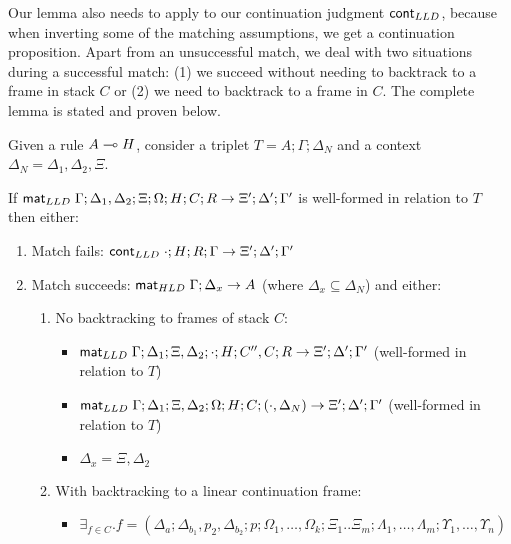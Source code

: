 Our lemma also needs to apply to our continuation judgment $\mathsf{cont}_{LLD}$, because when inverting some of
the matching assumptions, we get a continuation proposition. Apart from an unsuccessful match, we deal
with two situations during a successful match: (1) we succeed without needing to backtrack to a frame
in stack $C$ or (2) we need to backtrack to a frame in $C$. The complete lemma is stated and proven below.

{\footnotesize
\begin{lemma}\label{thm:body_match}
   
Given a rule $A \multimap H$, consider a triplet $T = A; \Gamma; \Delta_{N}$ and a context $\Delta_{N} = \Delta_1, \Delta_2, \Xi$.

If $\mathsf{mat}_{LLD} \; \Gamma; \Delta_1, \Delta_2; \Xi; \Omega; H; C; R \rightarrow \Xi';
\Delta'; \Gamma'$ is well-formed in relation to $T$ then either:

\begin{enumerate}
   \item Match fails: $\mathsf{cont}_{LLD} \; \cdot; H; R; \Gamma \rightarrow \Xi'; \Delta'; \Gamma'$
   \item Match succeeds: $\mathsf{mat}_{HLD} \; \Gamma; \Delta_x \rightarrow A$ (where $\Delta_x
         \subseteq \Delta_N$) and either:
      \begin{enumerate}
         \item No backtracking to frames of stack $C$:
         
         \begin{itemize}
            \item $\mathsf{mat}_{LLD} \; \Gamma; \Delta_1; \Xi, \Delta_2; \cdot; H; C'', C; R
               \rightarrow \Xi'; \Delta'; \Gamma'$ (well-formed in relation to $T$)
            \item $\mathsf{mat}_{LLD} \; \Gamma; \Delta_1; \Xi, \Delta_2; \Omega; H; C; (\cdot, \Delta_N) \rightarrow \Xi'; \Delta'; \Gamma'$ (well-formed in relation to $T$)
            \item $\Delta_x = \Xi, \Delta_2$
         \end{itemize}

         \item With backtracking to a linear continuation frame:
         
         \begin{itemize}

            \item $\exists_{f \in C}. f = (\Delta_a; \Delta_{b_1}, p_2, \Delta_{b_2}; p;
                  \Omega_1, \dotsc, \Omega_k; \Xi_1 .. \Xi_m; \Lambda_1, \dotsc,
                  \Lambda_m; \Upsilon_1, \dotsc, \Upsilon_n)$


\end{itemize}
\end{enumerate}
\end{enumerate}
\end{lemma}}
